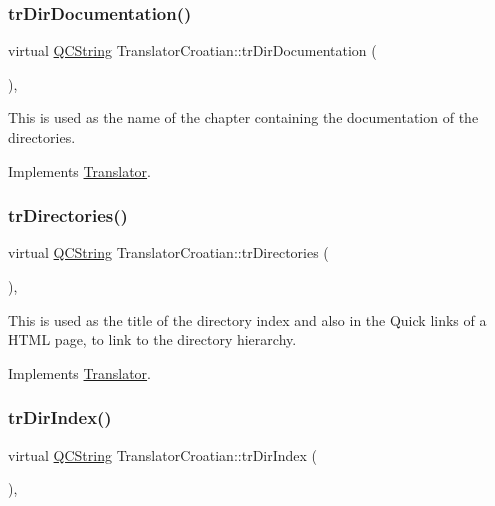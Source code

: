 \subsubsection{\texorpdfstring{trDirDocumentation()}{trDirDocumentation()}}
{\footnotesize\ttfamily virtual \mbox{\hyperlink{class_q_c_string}{Q\+C\+String}} Translator\+Croatian\+::tr\+Dir\+Documentation (\begin{DoxyParamCaption}{ }\end{DoxyParamCaption})\hspace{0.3cm}{\ttfamily [inline]}, {\ttfamily [virtual]}}

This is used as the name of the chapter containing the documentation of the directories. 

Implements \mbox{\hyperlink{class_translator}{Translator}}.

\mbox{\label{class_translator_croatian_a6812879b0f7ebb41731785f8fc241487}} 
\subsubsection{\texorpdfstring{trDirectories()}{trDirectories()}}
{\footnotesize\ttfamily virtual \mbox{\hyperlink{class_q_c_string}{Q\+C\+String}} Translator\+Croatian\+::tr\+Directories (\begin{DoxyParamCaption}{ }\end{DoxyParamCaption})\hspace{0.3cm}{\ttfamily [inline]}, {\ttfamily [virtual]}}

This is used as the title of the directory index and also in the Quick links of a H\+T\+ML page, to link to the directory hierarchy. 

Implements \mbox{\hyperlink{class_translator}{Translator}}.

\mbox{\label{class_translator_croatian_ad8c5567eeebfd21c08cb853e31f66a5d}} 
\subsubsection{\texorpdfstring{trDirIndex()}{trDirIndex()}}
{\footnotesize\ttfamily virtual \mbox{\hyperlink{class_q_c_string}{Q\+C\+String}} Translator\+Croatian\+::tr\+Dir\+Index (\begin{DoxyParamCaption}{ }\end{DoxyParamCaption})\hspace{0.3cm}{\ttfamily [inline]}, {\ttfamily [virtual]}}

